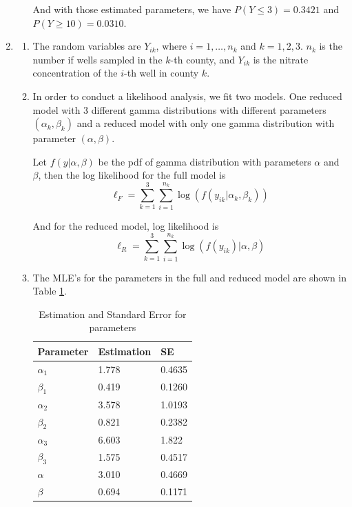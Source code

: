 \documentclass{article}
\begin{document}
\begin{enumerate}[leftmargin = 0 em, label = 4.\arabic*., font = \bfseries]
\begin{enumerate}
	And with those estimated parameters, we have $P(Y \leq 3) = 0.3421$ and $P(Y \geq 10) = 0.0310$.

	\end{enumerate}
	\newpage
	\item 
	\begin{enumerate}
		\item 
		The random variables are $Y_{ik}$, where $i = 1,\ldots, n_k$ and $k = 1,2,3$. $n_k$ is the number if wells sampled in the $k$-th county, and $Y_{ik}$ is the nitrate concentration of the $i$-th well in county $k$.

		\item 
		In order to conduct a likelihood analysis, we fit two models. One reduced model with 3 different gamma distributions with different parameters $(\alpha_k, \beta_k)$ and a reduced model with only one gamma distribution with parameter $(\alpha, \beta)$. 

		Let $f(y| \alpha, \beta)$ be the pdf of gamma distribution with parameters $\alpha$ and $\beta$, then the log likelihood for the full model is
		\[\ell_F  = \sum_{k=1}^3 \sum_{i = 1}^{n_k} \log (f(y_{ik}| \alpha_k, \beta_k))\]

		And for the reduced model, log likelihood is 
		\[\ell_R = \sum_{k=1}^3 \sum_{i = 1}^{n_k} \log (f(y_{ik})| \alpha , \beta)\]

		\newpage

		\item 
		The MLE's for the parameters in the full and reduced model are shown in Table \ref{est2}.
		\begin{table}[!htb]
			\centering
			\caption{Estimation and Standard Error for parameters}
			\label{est2}
			\begin{tabular}{lll}
			\toprule
			Parameter & Estimation &  SE\\ 
			\midrule
			$\alpha_1$ & 1.778 & 0.4635 \\
			$\beta_1$ & 0.419 & 0.1260 \\
			$\alpha_2$ & 3.578 & 1.0193\\
			$\beta_2$ & 0.821 & 0.2382 \\
			$\alpha_3$ & 6.603 & 1.822 \\
			$\beta_3$ & 1.575 & 0.4517\\
			$\alpha$ & 3.010 & 0.4669\\
			$\beta$ & 0.694 & 0.1171\\
			\bottomrule 
			\end{tabular}
				

\end{table}
\end{enumerate}
\end{enumerate}
\end{document}
